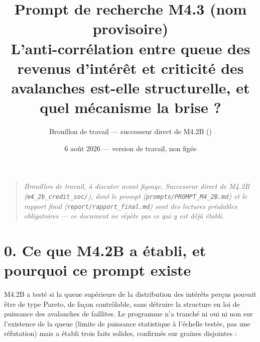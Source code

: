 \documentclass[11pt,a4paper]{article}
\title{Prompt de recherche M4.3 (nom provisoire)\\
\large L'anti-corrélation entre queue des revenus d'intérêt et
criticité des avalanches est-elle structurelle, et quel mécanisme la
brise ?}
\author{Brouillon de travail --- successeur direct de M4.2B
(\code{m4\_2b\_credit\_soc})}
\date{6 août 2026 --- version de travail, non figée}
\newcommand{\code}[1]{\texttt{#1}}
\begin{document}
\maketitle

\begin{quote}
\sloppy
\emph{Brouillon de travail, à discuter avant figeage. Successeur direct
de M4.2B (\code{m4\_2b\_credit\_soc/}), dont le prompt
(\code{prompts/PROMPT\_M4\_2B.md}) et le rapport final
(\code{report/rapport\_final.md}) sont des lectures préalables
obligatoires --- ce document ne répète pas ce qui y est déjà établi.}
\end{quote}

\tableofcontents

\section*{0. Ce que M4.2B a établi, et pourquoi ce prompt existe}

M4.2B a testé si la queue supérieure de la distribution des intérêts
perçus pouvait être de type Pareto, de façon contrôlable, sans détruire
la structure en loi de puissance des avalanches de faillites. Le
programme n'a tranché ni oui ni non sur l'existence de la queue (limite
de puissance statistique à l'échelle testée, pas une réfutation) mais a
établi trois faits solides, confirmés sur graines disjointes :
\end{document}
